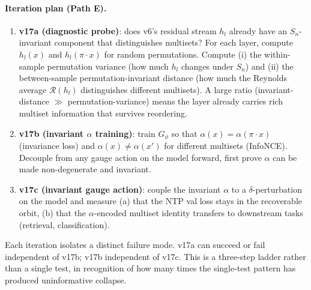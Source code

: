 \documentclass[11pt, a4paper]{article}
\theoremstyle{plain}
\theoremstyle{definition}
\theoremstyle{remark}
\begin{document}
\paragraph{Iteration plan (Path E).}
\begin{enumerate}[leftmargin=2em]
\item \textbf{v17a (diagnostic probe)}: does v6's residual stream $h_l$ already have an $S_n$-invariant component that distinguishes multisets?
For each layer, compute $h_l(x)$ and $h_l(\pi \cdot x)$ for random permutations.
Compute (i) the within-sample permutation variance (how much $h_l$ changes under $S_n$) and (ii) the between-sample permutation-invariant distance (how much the Reynolds average $\mathcal{R}(h_l)$ distinguishes different multisets).
A large ratio (invariant-distance $\gg$ permutation-variance) means the layer already carries rich multiset information that survives reordering.
\item \textbf{v17b (invariant $\alpha$ training)}: train $G_\phi$ so that $\alpha(x) = \alpha(\pi \cdot x)$ (invariance loss) and $\alpha(x) \neq \alpha(x')$ for different multisets (InfoNCE).
Decouple from any gauge action on the model forward, first prove $\alpha$ can be made non-degenerate and invariant.
\item \textbf{v17c (invariant gauge action)}: couple the invariant $\alpha$ to a $\delta$-perturbation on the model and measure (a) that the NTP val loss stays in the recoverable orbit, (b) that the $\alpha$-encoded multiset identity transfers to downstream tasks (retrieval, classification).
\end{enumerate}
Each iteration isolates a distinct failure mode.
v17a can succeed or fail independent of v17b; v17b independent of v17c.
This is a three-step ladder rather than a single test, in recognition of how many times the single-test pattern has produced uninformative collapse.
\end{document}
